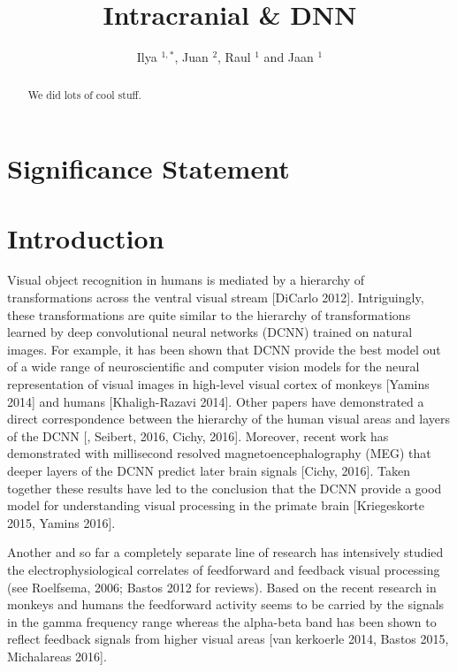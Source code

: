 \documentclass[final]{jneurosci}
\begin{document}
%
%
\title{Intracranial \& DNN}
\author{Ilya $^{1,\ast}$, Juan $^{2}$, Raul $^{1}$ and Jaan $^{1}$}
\address{$^{1}$Computational Neuroscience Lab, Institute of Computer Science, Universtity of Tartu, Estonia\\$^{2}$???}


%
%
\begin{abstract}
We did lots of cool stuff.
\vskip1pt
\end{abstract}
\maketitle


%
%
\section{Significance Statement}


%
%
\section{Introduction}
Visual object recognition in humans is mediated by a hierarchy of transformations across the ventral visual stream [DiCarlo 2012]. Intriguingly, these transformations are quite similar to the hierarchy of transformations learned by deep convolutional neural networks (DCNN) trained on natural images. For example, it has been shown that DCNN provide the best model out of a wide range of neuroscientific and computer vision models for the neural representation of visual images in high-level visual cortex of monkeys [Yamins 2014] and humans [Khaligh-Razavi 2014]. Other papers have demonstrated a direct correspondence between the hierarchy of the human visual areas and layers of the DCNN [\citep{gucclu2015deep}, Seibert, 2016, Cichy, 2016]. Moreover, recent work has demonstrated with millisecond resolved magnetoencephalography (MEG) that deeper layers of the DCNN predict later brain signals [Cichy, 2016]. Taken together these results have led to the conclusion that the DCNN provide a good model for understanding visual processing in the primate brain  [Kriegeskorte 2015, Yamins 2016].

Another and so far a completely separate line of research has intensively studied the electrophysiological correlates of feedforward and feedback visual processing (see Roelfsema, 2006; Bastos 2012 for reviews).
Based on the recent research in monkeys and humans the feedforward activity seems to be carried by the signals in the gamma frequency range whereas the alpha-beta band has been shown to reflect feedback signals from higher visual areas [van kerkoerle 2014, Bastos 2015, Michalareas 2016].  
\end{document}
